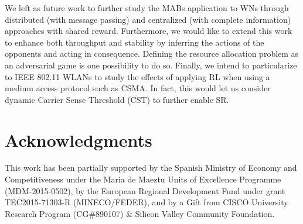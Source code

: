 \documentclass[preprint,12pt]{elsarticle}
\begin{document}
We left as future work to further study the MABs application to WNs through distributed (with message passing) and centralized (with complete information) approaches with shared reward. Furthermore, we would like to extend this work to enhance both throughput and stability by inferring the actions of the opponents and acting in consequence. Defining the resource allocation problem as an adversarial game is one possibility to do so. Finally, we intend to particularize to IEEE 802.11 WLANs to study the effects of applying RL when using a medium access protocol such as CSMA. In fact, this would let us consider dynamic Carrier Sense Threshold (CST) to further enable SR.

\section*{Acknowledgments}
This work has been partially supported by the Spanish Ministry of Economy and Competitiveness under the Maria de Maeztu Units of Excellence Programme (MDM-2015-0502), by the European Regional Development Fund under grant TEC2015-71303-R (MINECO/FEDER), and by a Gift from CISCO University Research Program (CG\#890107) \& Silicon Valley Community Foundation.

\newpage


\end{document}
